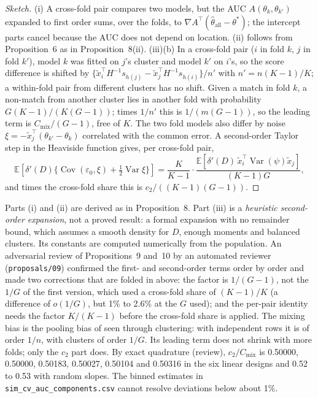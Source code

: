 \documentclass[11pt]{amsart}
\theoremstyle{plain}
\theoremstyle{definition}
\theoremstyle{remark}
\newcommand{\Var}{\operatorname{Var}}
\newcommand{\Cov}{\operatorname{Cov}}
\newcommand{\E}{\mathbb{E}}
\newcommand{\Cmix}{C_{\mathrm{mix}}}
\begin{document}
\begin{proof}[Sketch]
(i) A cross-fold pair compares two models, but the AUC $A(\theta_k,\theta_{k'})$ expanded to first order sums, over the folds, to $\nabla A^\top(\hat\theta_{\mathrm{all}}-\theta^*)$; the intercept parts cancel because the AUC does not depend on location. (ii) follows from Proposition~6 as in Proposition~8(ii). (iii)(b) In a cross-fold pair ($i$ in fold $k$, $j$ in fold $k'$), model $k$ was fitted on $j$'s cluster and model $k'$ on $i$'s, so the score difference is shifted by $\{\tilde x_i^\top H^{-1}s_{h(j)}-\tilde x_j^\top H^{-1}s_{h(i)}\}/n'$ with $n'=n(K-1)/K$; a within-fold pair from different clusters has no shift. Given a match in fold $k$, a non-match from another cluster lies in another fold with probability $G(K-1)/(K(G-1))$; times $1/n'$ this is $1/(m(G-1))$, so the leading term is $\Cmix/(G-1)$, free of $K$. The two fold models also differ by noise $\xi=-\tilde x_j^\top(\theta_{k'}-\theta_k)$ correlated with the common error. A second-order Taylor step in the Heaviside function gives, per cross-fold pair,
\[
\E[\delta'(D)\{\Cov(\varepsilon_0,\xi)+\tfrac12\Var\xi\}]=\frac{K}{K-1}\cdot\frac{\E[\delta'(D)\,\tilde x_i^\top\Var(\psi)\tilde x_j]}{(K-1)G},
\]
and times the cross-fold share this is $c_2/((K-1)(G-1))$.
\end{proof}

Parts (i) and (ii) are derived as in Proposition~8. Part (iii) is a \emph{heuristic second-order expansion}, not a proved result: a formal expansion with no remainder bound, which assumes a smooth density for $D$, enough moments and balanced clusters. Its constants are computed numerically from the population. An adversarial review of Propositions~9 and~10 by an automated reviewer (\texttt{proposals/09}) confirmed the first- and second-order terms order by order and made two corrections that are folded in above: the factor is $1/(G-1)$, not the $1/G$ of the first version, which used a cross-fold share of $(K-1)/K$ (a difference of $o(1/G)$, but 1\% to 2.6\% at the $G$ used); and the per-pair identity needs the factor $K/(K-1)$ before the cross-fold share is applied. The mixing bias is the pooling bias of \cite{Parker,Forman} seen through clustering: with independent rows it is of order $1/n$, with clusters of order $1/G$. Its leading term does not shrink with more folds; only the $c_2$ part does. By exact quadrature (review), $c_2/\Cmix$ is 0.50000, 0.50000, 0.50183, 0.50027, 0.50104 and 0.50316 in the six linear designs and 0.52 to 0.53 with random slopes. The binned estimates in \texttt{sim\_cv\_auc\_components.csv} cannot resolve deviations below about 1\%.
\end{document}
